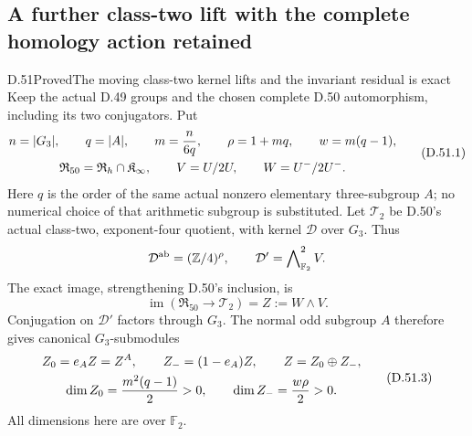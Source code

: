 \subsection{A further class-two lift with the complete homology action retained}

\begin{statement}{D.51}{Proved}{The moving class-two kernel lifts and the invariant residual is exact}
Keep the actual D.49 groups and the chosen complete D.50
automorphism, including its two conjugators. Put
\[
 \begin{gathered}
 n=|G_3|,\qquad q=|A|,\qquad m={n\over6q},\qquad
 \rho=1+mq,\qquad w=m(q-1),\\
 \mathfrak R_{50}=\mathfrak R_h\cap\mathfrak K_\infty,
 \qquad V=U/2U,\qquad W=U^-/2U^- .
 \end{gathered}
 \tag{D.51.1}
\]
Here \(q\) is the order of the same actual nonzero
elementary three-subgroup \(A\); no numerical choice
of that arithmetic subgroup is substituted.
Let \(\mathcal T_2\) be D.50's actual class-two,
exponent-four quotient, with kernel
\(\mathcal D\) over \(G_3\). Thus
\[
 \mathcal D^{\rm ab}=(\mathbb Z/4)^\rho,\qquad
 \mathcal D'=\bigwedge\nolimits^2_{\mathbb F_2}V .
\]
The exact image, strengthening D.50's inclusion, is
\[
 \operatorname{im}(\mathfrak R_{50}\to\mathcal T_2)
       =Z:=W\wedge V .
 \tag{D.51.2}
\]
Conjugation on \(\mathcal D'\) factors through \(G_3\).
The normal odd subgroup \(A\) therefore gives
canonical \(G_3\)-submodules
\[
 \begin{gathered}
 Z_0=e_A Z=Z^A,\qquad Z_-=(1-e_A)Z,\qquad Z=Z_0\oplus Z_-,\\
 \dim Z_0={m^2(q-1)\over2}>0,\qquad
 \dim Z_-={w\rho\over2}>0 .
 \end{gathered}
 \tag{D.51.3}
\]
All dimensions here are over \(\mathbb F_2\).


\end{statement}
